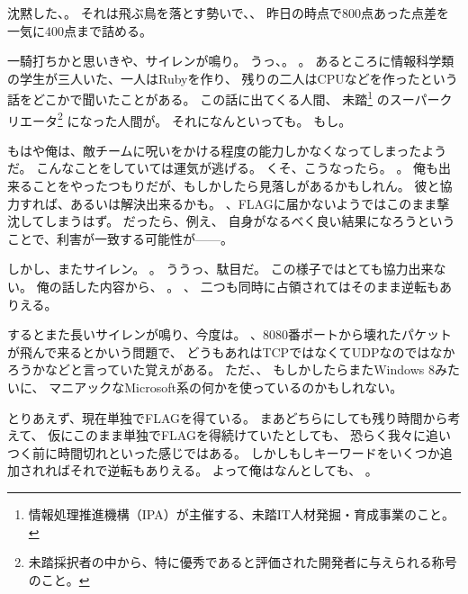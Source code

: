 沈黙した、。
それは飛ぶ鳥を落とす勢いで、、
昨日の時点で800点あった点差を一気に400点まで詰める。

一騎打ちかと思いきや、サイレンが鳴り。
うっ、。
。
あるところに情報科学類の学生が三人いた、一人はRubyを作り、
残りの二人はCPUなどを作ったという話をどこかで聞いたことがある。
この話に出てくる人間、
未踏\footnote{情報処理推進機構（IPA）が主催する、未踏IT人材発掘・育成事業のこと。}%
のスーパークリエータ\footnote{未踏採択者の中から、特に優秀であると評価された開発者に与えられる称号のこと。}%
になった人間が。
それになんといっても。
もし。

もはや俺は、敵チームに呪いをかける程度の能力しかなくなってしまったようだ。
こんなことをしていては運気が逃げる。
くそ、こうなったら。
。
俺も出来ることをやったつもりだが、もしかしたら見落しがあるかもしれん。
彼と協力すれば、あるいは解決出来るかも。
、FLAGに届かないようではこのまま撃沈してしまうはず。
だったら、例え、
自身がなるべく良い結果になろうということで、利害が一致する可能性が------。

しかし、またサイレン。
。
ううっ、駄目だ。
この様子ではとても協力出来ない。
俺の話した内容から、
。
、
二つも同時に占領されてはそのまま逆転もありえる。

するとまた長いサイレンが鳴り、今度は。
、8080番ポートから壊れたパケットが飛んで来るとかいう問題で、
どうもあれはTCPではなくてUDPなのではなかろうかなどと言っていた覚えがある。
ただ、、
もしかしたらまたWindows 8みたいに、
マニアックなMicrosoft系の何かを使っているのかもしれない。

とりあえず、現在単独でFLAGを得ている。
まあどちらにしても残り時間から考えて、
仮にこのまま単独でFLAGを得続けていたとしても、
恐らく我々に追いつく前に時間切れといった感じではある。
しかしもしキーワードをいくつか追加されればそれで逆転もありえる。
よって俺はなんとしても、
。

